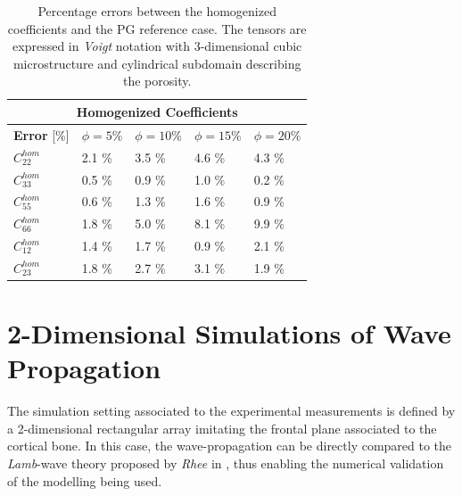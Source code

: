 \begin{table}[!h]
\centering
    \begin{tabular}{ |p{2.2cm}||p{2cm}|p{2cm}|p{2cm}|p{2cm}| }
    \hline
    \multicolumn{5}{|c|}{\textbf{Homogenized Coefficients}} \\
    \hline
    \textbf{Error} [\%] & $\phi = 5 \%$ & $\phi = 10 \%$ & $\phi = 15 \%$ & $\phi = 20 \%$ \\
    \hline
    $C^{hom}_{22}$ & 2.1 \% & 3.5 \% & 4.6 \% & 4.3 \% \\
    $C^{hom}_{33}$ & 0.5 \% & 0.9 \% & 1.0 \% & 0.2 \% \\
    $C^{hom}_{55}$ & 0.6 \% & 1.3 \% & 1.6 \% & 0.9 \% \\
    $C^{hom}_{66}$ & 1.8 \% & 5.0 \% & 8.1 \% & 9.9 \% \\
    $C^{hom}_{12}$ & 1.4 \% & 1.7 \% & 0.9 \% & 2.1 \% \\
    $C^{hom}_{23}$ & 1.8 \% & 2.7 \% & 3.1 \% & 1.9 \% \\
    \hline
    \end{tabular}
    \caption{Percentage errors between the homogenized coefficients and the PG reference case. The tensors are expressed in \textit{Voigt} notation with 3-dimensional cubic microstructure and cylindrical subdomain describing the porosity.}
    \label{Hom3dCoeffSquareTable}
\end{table}

\section{2-Dimensional Simulations of Wave Propagation}
The simulation setting associated to the experimental measurements is defined by a 2-dimensional rectangular array imitating the frontal plane associated to the cortical bone. In this case, the wave-propagation can be directly compared to the \textit{Lamb}-wave  theory proposed by \textit{Rhee} in \cite{Rhee2007}, thus enabling the numerical validation of the modelling being used. 

